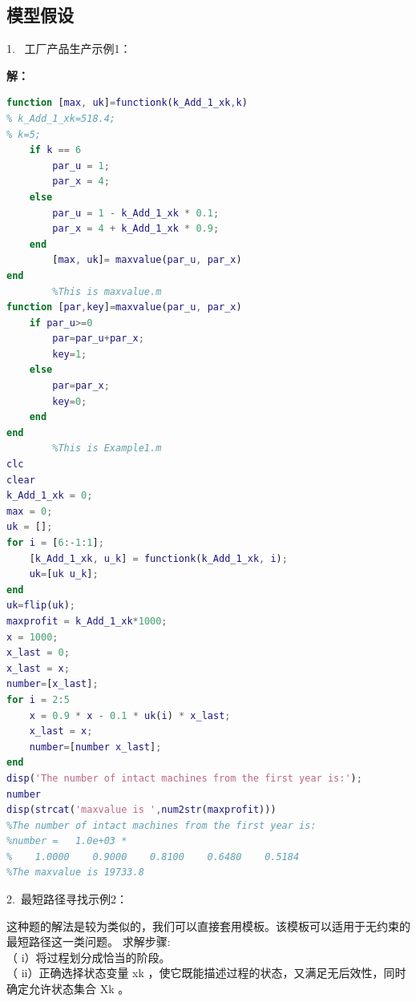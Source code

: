 \documentclass[a4paper,20pt]{article}
\begin{document}
\subsection{模型假设}
1.~ 工厂产品生产示例1：
\par \noindent {}
\par \noindent \textbf{解：}
\begin{center}
    \begin{lstlisting}[caption={Example1},language=Matlab]
        %This is functionk.m
function [max, uk]=functionk(k_Add_1_xk,k)
% k_Add_1_xk=518.4;
% k=5;
    if k == 6
        par_u = 1;
        par_x = 4;
    else
        par_u = 1 - k_Add_1_xk * 0.1;
        par_x = 4 + k_Add_1_xk * 0.9;
    end
        [max, uk]= maxvalue(par_u, par_x)
end
        %This is maxvalue.m
function [par,key]=maxvalue(par_u, par_x)
    if par_u>=0
        par=par_u+par_x;
        key=1;
    else
        par=par_x;
        key=0;
    end
end
        %This is Example1.m
clc
clear
k_Add_1_xk = 0;
max = 0;
uk = [];
for i = [6:-1:1];
    [k_Add_1_xk, u_k] = functionk(k_Add_1_xk, i);
    uk=[uk u_k];
end
uk=flip(uk);
maxprofit = k_Add_1_xk*1000;
x = 1000; 
x_last = 0;
x_last = x;
number=[x_last];
for i = 2:5
    x = 0.9 * x - 0.1 * uk(i) * x_last;
    x_last = x;
    number=[number x_last];
end
disp('The number of intact machines from the first year is:');
number
disp(strcat('maxvalue is ',num2str(maxprofit)))
%The number of intact machines from the first year is:
%number =   1.0e+03 *
%    1.0000    0.9000    0.8100    0.6480    0.5184
%The maxvalue is 19733.8
    \end{lstlisting}
\end{center}
2.~最短路径寻找示例2：
\par \noindent {}
\par 这种题的解法是较为类似的，我们可以直接套用模板。该模板可以适用于无约束的最短路径这一类问题。
求解步骤:
\\（ i）将过程划分成恰当的阶段。
\\（ ii）正确选择状态变量 xk ，使它既能描述过程的状态，又满足无后效性，同时确定允许状态集合 Xk 。
\end{document}
